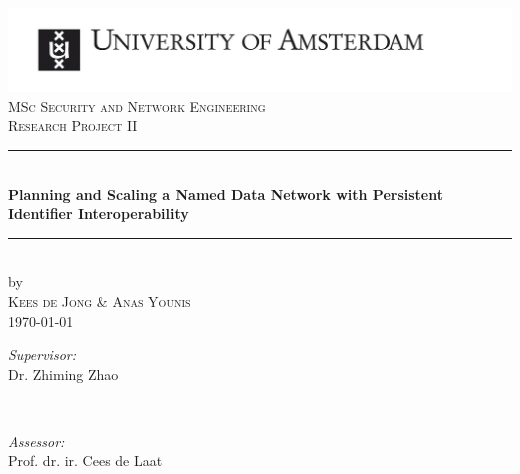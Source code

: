 \documentclass[letterpaper,12pt]{article}
\begin{document}
\begin{titlepage}

\newcommand{\HRule}{\rule{\linewidth}{0.5mm}}

\begin{center}
\includegraphics[width=\linewidth]{Images/uvaeng}\\[2.5cm]
\textsc{\Large MSc Security and Network Engineering}\\[0.2cm]
\textsc{\Large Research Project II}\\[0.5cm] 

\HRule \\[0.4cm]
{\huge \bfseries Planning and Scaling a Named Data Network with Persistent Identifier Interoperability}\\[0.4cm]
\HRule \\[0.5cm]
 
by\\[0.2cm]
\textsc{\Large Kees de Jong \& Anas Younis}\\[0.2cm]

{\Large \today}\\[1cm]

\begin{minipage}[t]{0.4\textwidth}
\begin{flushleft} \large
\emph{Supervisor:} \\
Dr. Zhiming Zhao
\end{flushleft}
\end{minipage}
~
\begin{minipage}[t]{0.4\textwidth}
\begin{flushright} \large
\emph{Assessor:} \\
Prof. dr. ir. Cees de Laat\\
\end{flushright}
\end{minipage}\\[2cm]

\vfill

\end{center}
\end{titlepage}

\tableofcontents












\printbibliography
\end{document}
